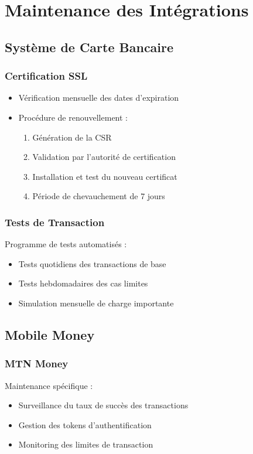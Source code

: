 \documentclass[14pt,a4paper]{report}
\begin{document}
\section{Maintenance des Intégrations}
\subsection{Système de Carte Bancaire}
\subsubsection{Certification SSL}
\begin{itemize}
    \item Vérification mensuelle des dates d'expiration
    \item Procédure de renouvellement :
        \begin{enumerate}
            \item Génération de la CSR
            \item Validation par l'autorité de certification
            \item Installation et test du nouveau certificat
            \item Période de chevauchement de 7 jours
        \end{enumerate}
\end{itemize}

\subsubsection{Tests de Transaction}
Programme de tests automatisés :
\begin{itemize}
    \item Tests quotidiens des transactions de base
    \item Tests hebdomadaires des cas limites
    \item Simulation mensuelle de charge importante
\end{itemize}

\subsection{Mobile Money}
\subsubsection{MTN Money}
Maintenance spécifique :
\begin{itemize}
    \item Surveillance du taux de succès des transactions
    \item Gestion des tokens d'authentification
    \item Monitoring des limites de transaction
\end{itemize}
\end{document}
